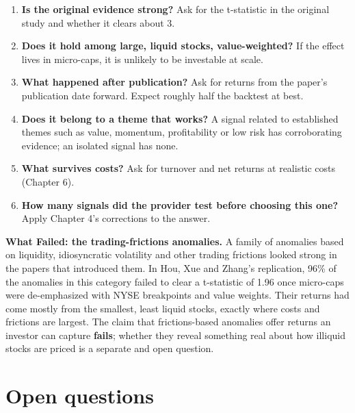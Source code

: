 \begin{enumerate}
  \item \textbf{Is the original evidence strong?} Ask for the t-statistic in the original study and whether it clears about 3.
  \item \textbf{Does it hold among large, liquid stocks, value-weighted?} If the effect lives in micro-caps, it is unlikely to be investable at scale.
  \item \textbf{What happened after publication?} Ask for returns from the paper's publication date forward. Expect roughly half the backtest at best.
  \item \textbf{Does it belong to a theme that works?} A signal related to established themes such as value, momentum, profitability or low risk has corroborating evidence; an isolated signal has none.
  \item \textbf{What survives costs?} Ask for turnover and net returns at realistic costs (Chapter 6).
  \item \textbf{How many signals did the provider test before choosing this one?} Apply Chapter 4's corrections to the answer.
\end{enumerate}

\begin{callout}
\textbf{What Failed: the trading-frictions anomalies.} A family of anomalies based on liquidity, idiosyncratic volatility and other trading frictions looked strong in the papers that introduced them. In Hou, Xue and Zhang's replication, 96\% of the anomalies in this category failed to clear a t-statistic of 1.96 once micro-caps were de-emphasized with NYSE breakpoints and value weights. Their returns had come mostly from the smallest, least liquid stocks, exactly where costs and frictions are largest. The claim that frictions-based anomalies offer returns an investor can capture \textbf{fails}; whether they reveal something real about how illiquid stocks are priced is a separate and open question.
\end{callout}

\section{Open questions}
\label{sec:10-open}

